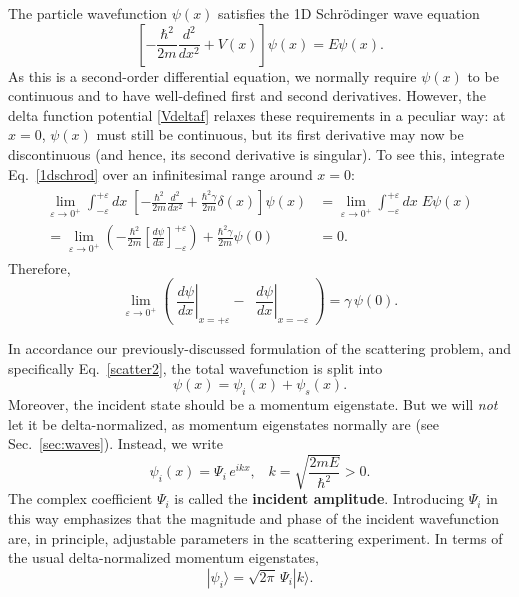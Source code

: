 \documentclass[pra,12pt]{revtex4-2}
\begin{document}
The particle wavefunction $\psi(x)$ satisfies the 1D Schr\"odinger
wave equation
\begin{equation}
  \left[-\frac{\hbar^2}{2m} \frac{d^2}{dx^2} + V(x) \right] \psi(x)
  = E \psi(x).
  \label{1dschrod}
\end{equation}
As this is a second-order differential equation, we normally require
$\psi(x)$ to be continuous and to have well-defined first and second
derivatives.  However, the delta function potential \eqref{Vdeltaf}
relaxes these requirements in a peculiar way: at $x=0$, $\psi(x)$ must
still be continuous, but its first derivative may now be discontinuous
(and hence, its second derivative is singular).  To see this,
integrate Eq.~\eqref{1dschrod} over an infinitesimal range around $x =
0$:
\begin{align}
  \begin{aligned}\lim_{\varepsilon\rightarrow 0^+} \int_{-\varepsilon}^{+\varepsilon} dx\; \left[-\frac{\hbar^2}{2m} \frac{d^2}{dx^2} + \frac{\hbar^2\gamma}{2m} \delta(x)\right] \psi(x) &= \lim_{\varepsilon\rightarrow 0^+} \int_{-\varepsilon}^{+\varepsilon} dx\; E \psi(x) \\ = \lim_{\varepsilon\rightarrow 0^+} \left(-\frac{\hbar^2}{2m} \left[\frac{d\psi}{dx}\right]_{-\varepsilon}^{+\varepsilon} \right) + \frac{\hbar^2\gamma}{2m} \psi(0) &= 0.
  \end{aligned}
\end{align}
Therefore,
\begin{equation}
  \lim_{\varepsilon\rightarrow 0^+} \left(\; \left.\frac{d\psi}{dx}\right|_{x = +\varepsilon} - \;\; \left.\frac{d\psi}{dx}\right|_{x = -\varepsilon}\; \right) =  \gamma \,\psi(0).
  \label{delta_discontinuity}
\end{equation}

In accordance our previously-discussed formulation of the scattering
problem, and specifically Eq.~\eqref{scatter2}, the total wavefunction
is split into
\begin{equation}
  \psi(x) = \psi_i(x) + \psi_s(x).
\end{equation}
Moreover, the incident state should be a momentum eigenstate.  But we
will \textit{not} let it be delta-normalized, as momentum eigenstates
normally are (see Sec.~\ref{sec:waves}).  Instead, we write
\begin{equation}
  \psi_i(x) = \Psi_i \, e^{ik x},
  \;\;\;k = \sqrt{\frac{2mE}{\hbar^2}} > 0.
  \label{psiin1d}
\end{equation}
The complex coefficient $\Psi_i$ is called the \textbf{incident
  amplitude}.  Introducing $\Psi_i$ in this way emphasizes that the
magnitude and phase of the incident wavefunction are, in principle,
adjustable parameters in the scattering experiment.  In terms of the
usual delta-normalized momentum eigenstates,
\begin{equation}
  |\psi_i\rangle = \sqrt{2\pi}\, \Psi_i |k\rangle.
\end{equation}
\end{document}

